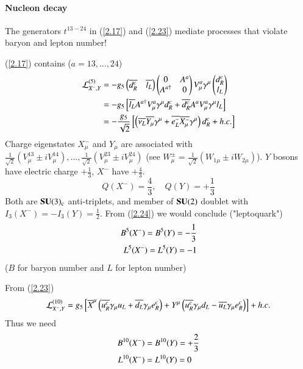 \paragraph{Nucleon decay}
The generators $t^{13-24}$ in (\ref{2.17}) and (\ref{2.23}) mediate processes that violate baryon and lepton number!

(\ref{2.17}) contains ($a = 13, \dots, 24$)
\begin{align}
   \mathcal{L}_{X^-, Y}^{(5)} &= -g_5 \begin{pmatrix} \overline{d^c_R} & \overline{l_L}\end{pmatrix} \begin{pmatrix} 0 & A^a \\ A^{a \dagger} & 0 \end{pmatrix} V_\mu^a \gamma^\mu \begin{pmatrix} d_R^c \\ l_L \end{pmatrix} \notag \\
   &= - g_5 \left[ \overline{l_L}A^{a\dagger} V_\mu^a \gamma^\mu d_R^c + \overline{d^c_R}A^a V_\mu^a \gamma^\mu l_L \right] \notag \\
   &= - \frac{g_5}{\sqrt{2}} \left[ \left( \overline{\nu_L} \overline{Y_\mu} \gamma^\mu + \overline{e^-_L} \overline{X^-_\mu} \gamma^\mu \right)d_R^c + h.c. \right] \label{2.24}
\end{align}
Charge eigenstates $X^-_\mu$ and $Y_\mu$ are associated with $\frac{1}{\sqrt{2}}(V_\mu^{13} \pm i V_\mu^{14}), \dots, \frac{1}{\sqrt{2}}(V_\mu^{23} \pm i V_\mu^{24})$ (see $W_\mu^\pm =\frac{1}{\sqrt{2}} (W_{1\mu} \pm i W_{2\mu})$). $Y$ bosons have electric charge $+\frac{1}{3}$, $X^{-}$ have $+ \frac{4}{3}$. 
\begin{equation}
   Q(X^-) = \frac{4}{3}, \quad Q(Y) = + \frac{1}{3}
\end{equation}
Both are $\mathbf{SU}(3)_\text{c}$ anti-triplets, and member of $\mathbf{SU}(2)$ doublet with $I_3(X^-) = -I_3(Y) = \frac{1}{2}$. From (\ref{2.24}) we would conclude ("leptoquark")
\begin{align}
   B^5(X^-) = B^5(Y) = - \frac{1}{3}  \notag \\
   L^5(X^-) = L^5(Y) = -1 \label{2.25}
\end{align}
($B$ for baryon number and $L$ for lepton number)

From (\ref{2.23})
\begin{equation}
   \mathcal{L}_{X^-,Y}^{(10)} = g_5 \left[ \overline{X}^\mu \left( \overline{u^c_R} \gamma_\mu u_L + \overline{d_L} \gamma_\mu e^c_R \right) + Y^\mu \left( \overline{u^c_R} \gamma_\mu d_L - \overline{u_L} \gamma_\mu e^c_R \right) \right] + h.c.
\end{equation}
Thus we need 
\begin{align}
   B^{10}(X^-) &= B^{10}(Y)=+\frac{2}{3} \notag \\
   L^{10}(X^-) &= L^{10}(Y) = 0 \label{2.27}
\end{align}

